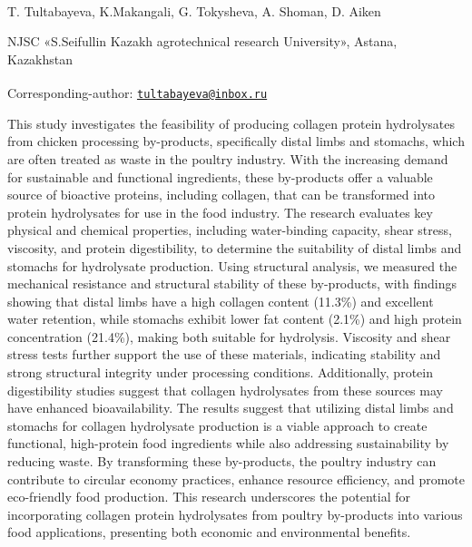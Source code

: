 
\begin{articleheader}

T. Tultabayeva\textsuperscript{\envelope }, K.Makangali, G. Tokysheva, A. Shoman,
D. Aiken
\end{articleheader}

\begin{affiliation}
NJSC «S.Seifullin Kazakh agrotechnical research University», Astana,
Kazakhstan

\raggedright {\bfseries \textsuperscript{\envelope }}Corresponding-author: \href{mailto:tultabayeva@inbox.ru}{\nolinkurl{tultabayeva@inbox.ru}}
\end{affiliation}

This study investigates the feasibility of producing collagen protein
hydrolysates from chicken processing by-products, specifically distal
limbs and stomachs, which are often treated as waste in the poultry
industry. With the increasing demand for sustainable and functional
ingredients, these by-products offer a valuable source of bioactive
proteins, including collagen, that can be transformed into protein
hydrolysates for use in the food industry. The research evaluates key
physical and chemical properties, including water-binding capacity,
shear stress, viscosity, and protein digestibility, to determine the
suitability of distal limbs and stomachs for hydrolysate production.
Using structural analysis, we measured the mechanical resistance and
structural stability of these by-products, with findings showing that
distal limbs have a high collagen content (11.3\%) and excellent water
retention, while stomachs exhibit lower fat content (2.1\%) and high
protein concentration (21.4\%), making both suitable for hydrolysis.
Viscosity and shear stress tests further support the use of these
materials, indicating stability and strong structural integrity under
processing conditions. Additionally, protein digestibility studies
suggest that collagen hydrolysates from these sources may have enhanced
bioavailability. The results suggest that utilizing distal limbs and
stomachs for collagen hydrolysate production is a viable approach to
create functional, high-protein food ingredients while also addressing
sustainability by reducing waste. By transforming these by-products, the
poultry industry can contribute to circular economy practices, enhance
resource efficiency, and promote eco-friendly food production. This
research underscores the potential for incorporating collagen protein
hydrolysates from poultry by-products into various food applications,
presenting both economic and environmental benefits.

